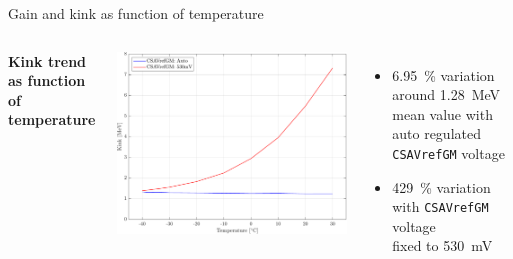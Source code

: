 \documentclass[aspectratio=169,xcolor=dvipsnames,handout]{beamer} %
\newcommand{\xmark}{\ding{55}}
\newcommand{\greencheck}{{\color{ForestGreen}\checkmark}}
\newcommand{\redcross}{{\color{Red}\xmark}}
\begin{document}
\begin{frame}{Gain and kink as function of temperature}
\begin{columns}
            \textbf{Kink trend as function of temperature}
            \begin{columns}
                \addtolength{\leftmargini}{\labelsep}
                    \vskip0.1cm
                    \centering
                    \includegraphics[width=1.15\textwidth]{images/temperature_effects/plot_pedestal_gain_auto_530mV.pdf}
                    \raggedleft
                    \begin{itemize}
                        \item \SI{6.95}{\percent} variation around \SI{1.28}{\mega\electronvolt} mean value with auto regulated \texttt{CSAVrefGM} voltage \greencheck
                        \item \SI{429}{\percent} variation with \texttt{CSAVrefGM} voltage\\ fixed to \SI{530}{\milli\volt} \redcross
                    \end{itemize}
            \end{columns}
            \vspace{0.5cm}
    \end{columns}
\end{frame}


\end{document}
